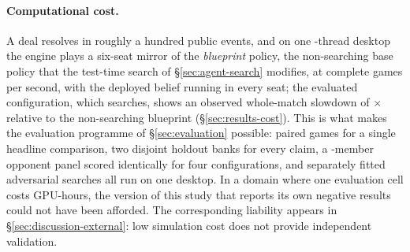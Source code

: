 \paragraph{Computational cost.}
A deal resolves in roughly a hundred public events, and on one \vsevenMirrorThreads{}-thread
desktop the engine plays a six-seat mirror of the \emph{blueprint} policy, the non-searching base
policy that the test-time search of \S\ref{sec:agent-search} modifies, at
\vsevenMirrorGamesPerSec{} complete games per second, with the deployed belief running in every
seat; the evaluated configuration, which searches, shows an observed whole-match slowdown of
\vsevenCostFrozenTight$\times$ relative to the non-searching blueprint (\S\ref{sec:results-cost}). This is what makes
the evaluation programme of \S\ref{sec:evaluation} possible: \vsevenBtwoFcheapN{} paired games for a
single headline comparison, two disjoint holdout banks for every claim, a \vsevenPanelMembers{}-member
opponent panel scored identically for four configurations, and \vsevenBfourArmsWord{} separately
fitted adversarial searches all run on one desktop. In a domain where one evaluation cell costs
GPU-hours, the version of this study that reports its own negative results could not have been
afforded. The corresponding liability appears in \S\ref{sec:discussion-external}: low simulation
cost does not provide independent validation.

